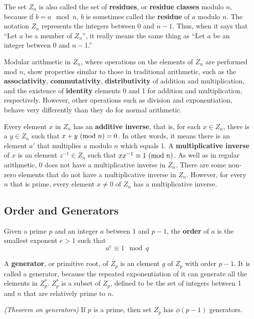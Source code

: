 The set $Z_{n}$ is also called the set of \textbf{residues}, or \textbf{residue classes} modulo $n$, because if $b=a \mod n$, $b$ is sometimes called the \textbf{residue} of $a$ modulo $n$. The notation $Z_{n}$ represents the integers between 0 and $n-1$. Thus, when it says that ``Let $a$ be a member of $Z_{n}$'', it really means the same thing as ``Let $a$ be an integer between 0 and $n-1$.''

Modular arithmetic in $Z_{n}$, where operations on the elements of $Z_{n}$ are performed mod $n$, show properties similar to those in traditional arithmetic, such as the \textbf{associativity}, \textbf{commutativity}, \textbf{distributivity} of addition and multiplication, and the existence of \textbf{identity} elements 0 and 1 for addition and multiplication, respectively. However, other operations such as division and exponentiation, behave very differently than they do for normal arithmetic. 

Every element $x$ in $Z_{n}$ has an \textbf{additive inverse}, that is, for each $x \in Z_{n}$, there is a $y \in Z_{n}$ such that $x + y \ (\text{mod}\ n) = 0$. In other words, it means there is an element $a'$ that multiplies $a$ modulo $n$ which equals 1.  A \textbf{multiplicative inverse} of $x$ is an element $z^{-1} \in Z_{n}$ such that $xx^{-1} \equiv 1 \ (\text{mod}\ n)$. As well as in regular arithmetic, 0 does not have a multiplicative inverse in $Z_{n}$. There are some non-zero elements that do not have a multiplicative inverse in $Z_{n}$. However, for every $n$ that is prime, every element $x \ne 0$ of $Z_{n}$ has a multiplicative inverse.

\subsection{Order and Generators}

Given a prime $p$ and an integer $a$ between 1 and $p-1$, the \textbf{order} of $a$ is the smallest exponent $e > 1 $ such that
\begin{equation}
  a^{e} \equiv 1 \mod q
\end{equation}

A \textbf{generator}, or primitive root, of $Z_{p}$ is an element $g$ of $Z_{p}$ with order $p-1$. It is called a generator, because the repeated exponentiation of it can generate all the elements in $Z_{p}^{*}$. $Z_{p}^{*}$ is a subset of $Z_{p}$, defined to be the set of integers between 1 and $n$ that are relatively prime to $n$. 

\begin{theorem}
\emph{(Theorem on generators)}
If $p$ is a prime, then set $Z_{p}$ has $\phi(p-1)$ generators.
\end{theorem}


